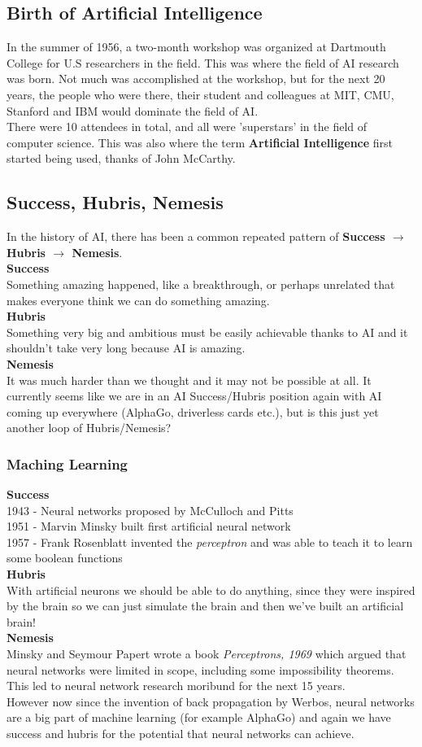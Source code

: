 \documentclass{article}
\newcommand{\n}[0]{\\[\baselineskip]}
\begin{document}
\subsection{Birth of Artificial Intelligence}
In the summer of 1956, a two-month workshop was organized at Dartmouth College for U.S researchers in the field. This was where the field of AI research was born. Not much was accomplished at the workshop, but for the next 20 years, the people who were there, their student and colleagues at MIT, CMU, Stanford and IBM would dominate the field of AI.
\n 
There were 10 attendees in total, and all were 'superstars' in the field of computer science. This was also where the term \textbf{Artificial Intelligence} first started being used, thanks of John McCarthy.

\subsection{Success, Hubris, Nemesis}
In the history of AI, there has been a common repeated pattern of \textbf{Success $\rightarrow$ Hubris $\rightarrow$ Nemesis}.
\n
\textbf{Success} \\
Something amazing happened, like a breakthrough, or perhaps unrelated that makes everyone think we can do something amazing.
\n
\textbf{Hubris} \\
Something very big and ambitious must be easily achievable thanks to AI and it shouldn't take very long because AI is amazing.
\n
\textbf{Nemesis} \\
It was much harder than we thought and it may not be possible at all. It currently seems like we are in an AI Success/Hubris position again with AI coming up everywhere (AlphaGo, driverless cards etc.), but is this just yet another loop of Hubris/Nemesis?

\subsubsection{Maching Learning}
\textbf{Success} \\
1943 - Neural networks proposed by McCulloch and Pitts \\
1951 - Marvin Minsky built first artificial neural network \\
1957 - Frank Rosenblatt invented the \textit{perceptron} and was able to teach it to learn some boolean functions
\n
\textbf{Hubris} \\
With artificial neurons we should be able to do anything, since they were inspired by the brain so we can just simulate the brain and then we've built an artificial brain!
\n
\textbf{Nemesis} \\
Minsky and Seymour Papert wrote a book \textit{Perceptrons, 1969} which argued that neural networks were limited in scope, including some impossibility theorems. This led to neural network research moribund for the next 15 years.
\n
However now since the invention of back propagation by Werbos, neural networks are a big part of machine learning (for example AlphaGo) and again we have success and hubris for the potential that neural networks can achieve.
\end{document}
